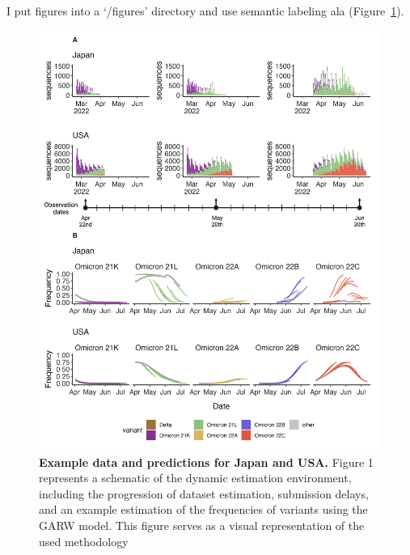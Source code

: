 \documentclass[11pt,oneside,letterpaper]{article}
\begin{document}
I put figures into a `/figures' directory and use semantic labeling ala (Figure~\ref{example_predictions}).

\begin{figure}[h]
	\centering
	\includegraphics[width=1.0\textwidth]{figures/example_predictions}
	\caption{\textbf{Example data and predictions for Japan and USA.}
	Figure 1 represents a schematic of the dynamic estimation environment, including the progression of dataset estimation, submission delays, and an example estimation of the frequencies of variants using the GARW model. This figure serves as a visual representation of the used methodology
	}
	\label{example_predictions}
\end{figure}
\end{document}
